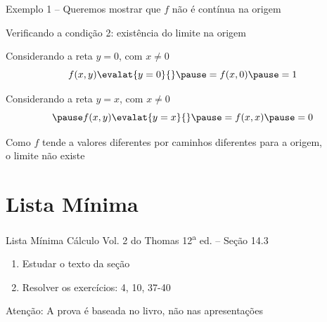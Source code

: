 \begin{frame}{Exemplo \theexemplo}
  1 -- Queremos mostrar que $f$ não é contínua na origem

  \pause
  Verificando a condição 2: existência do limite na origem

  \pause
  Considerando a reta $y=0$, com $x\neq 0$
  \pause
  \[
    f(x, y)\evalat{y=0}{}
    \pause
    = f(x, 0)
    \pause
    = 1
  \]

  \pause
  Considerando a reta $y=x$, com $x\neq 0$
  \[
    \pause
    f(x, y)\evalat{y=x}{}
    \pause
    = f(x, x)
    \pause
    = 0
  \]

  \pause
  Como $f$ tende a valores diferentes por
  caminhos diferentes para a origem,\\
  o limite não existe
\end{frame}


\section{Lista Mínima}

\begin{frame}{Lista Mínima}
  Cálculo Vol. 2 do Thomas 12\textsuperscript{a} ed. -- Seção 14.3
  \begin{enumerate}
    \item Estudar o texto da seção
    \item Resolver os exercícios: 4, 10, 37-40
  \end{enumerate}

  \vfill
  Atenção: A prova é baseada no livro, não nas apresentações
\end{frame}


